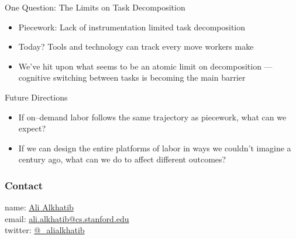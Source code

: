 \documentclass{beamer}
\begin{document}
\begin{frame}{One Question: The Limits on Task Decomposition}
  \begin{itemize}[<+- | alert@+>]
  \item Piecework: Lack of instrumentation limited task decomposition
  \item Today? Tools and technology can track every move workers make
  \item We've hit upon what seems to be an atomic limit on decomposition ---
        cognitive switching between tasks is becoming the main barrier
  \end{itemize}
\end{frame}


\begin{frame}{Future Directions}
  \begin{itemize}[<+- | alert@+>]
  \item If on--demand labor follows the same trajectory as piecework, what can we expect?
  \item If we can design the entire platforms of labor in ways we couldn't imagine a century ago, what can we do to affect different outcomes?
  \end{itemize}
\end{frame}


\begin{frame}
  \frametitle{Contact}
    name: \href{https://ali-alkhatib.com}{Ali Alkhatib} \\
    email: \href{mailto:ali.alkhatib@cs.stanford.edu}{ali.alkhatib@cs.stanford.edu} \\
    twitter: \href{https://twitter.com/_alialkhatib}{@\_alialkhatib} \\
\end{frame}
\end{document}
